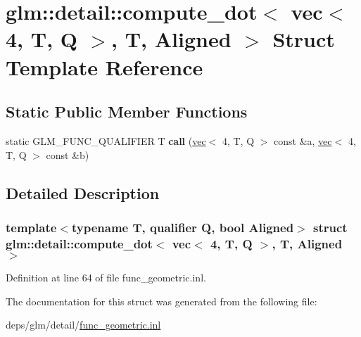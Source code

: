 \hypertarget{structglm_1_1detail_1_1compute__dot_3_01vec_3_014_00_01T_00_01Q_01_4_00_01T_00_01Aligned_01_4}{}\section{glm\+:\+:detail\+:\+:compute\+\_\+dot$<$ vec$<$ 4, T, Q $>$, T, Aligned $>$ Struct Template Reference}
\label{structglm_1_1detail_1_1compute__dot_3_01vec_3_014_00_01T_00_01Q_01_4_00_01T_00_01Aligned_01_4}
\subsection*{Static Public Member Functions}
\begin{DoxyCompactItemize}
\item 
\mbox{\label{structglm_1_1detail_1_1compute__dot_3_01vec_3_014_00_01T_00_01Q_01_4_00_01T_00_01Aligned_01_4_a960387a4cb95a1a796219b05f263d021}} 
static G\+L\+M\+\_\+\+F\+U\+N\+C\+\_\+\+Q\+U\+A\+L\+I\+F\+I\+ER T {\bfseries call} (\hyperlink{structglm_1_1vec}{vec}$<$ 4, T, Q $>$ const \&a, \hyperlink{structglm_1_1vec}{vec}$<$ 4, T, Q $>$ const \&b)
\end{DoxyCompactItemize}


\subsection{Detailed Description}
\subsubsection*{template$<$typename T, qualifier Q, bool Aligned$>$\newline
struct glm\+::detail\+::compute\+\_\+dot$<$ vec$<$ 4, T, Q $>$, T, Aligned $>$}



Definition at line 64 of file func\+\_\+geometric.\+inl.



The documentation for this struct was generated from the following file\+:\begin{DoxyCompactItemize}
\item 
deps/glm/detail/\hyperlink{func__geometric_8inl}{func\+\_\+geometric.\+inl}\end{DoxyCompactItemize}
